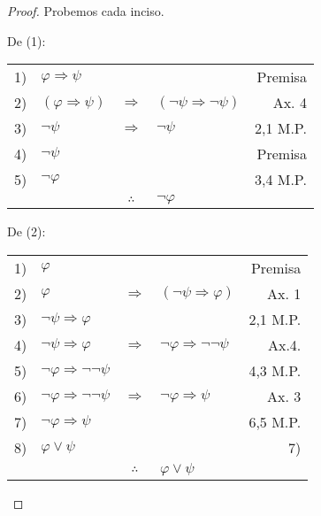 \documentclass[12pt]{report}
\theoremstyle{largebreak}
\begin{document}
    \begin{proof}
        Probemos cada inciso.
        
        De (1): 
        \begin{center}
            \begin{tabular}{l l c l r}
                1) & $\varphi\Rightarrow\psi$ & & & Premisa \\
                2) & $(\varphi\Rightarrow \psi)$ & $\Rightarrow$ & $(\neg \psi\Rightarrow\neg\psi)$ & Ax. 4 \\
                3) & $\neg\psi$ & $\Rightarrow$ & $\neg\psi$ & 2,1 M.P. \\
                4) & $\neg\psi$ &  &  & Premisa \\
                5) & $\neg\varphi$ &  &  & 3,4 M.P. \\
                \hline
                & & $\therefore$ & $\neg\varphi$ & \\
            \end{tabular}
        \end{center}

        De (2): 

        \begin{center}
            \begin{tabular}{l l c l r}
                1) & $\varphi$ & & & Premisa \\
                2) & $\varphi$ & $\Rightarrow$ & $(\neg\psi\Rightarrow\varphi)$ & Ax. 1 \\
                3) & $\neg\psi\Rightarrow\varphi$ & & & 2,1 M.P. \\
                4) & $\neg\psi\Rightarrow\varphi$ & $\Rightarrow$ & $\neg\varphi\Rightarrow\neg\neg\psi$ & Ax.4. \\
                5) & $\neg\varphi\Rightarrow\neg\neg\psi$ & & & 4,3 M.P. \\
                6) & $\neg\varphi\Rightarrow\neg\neg\psi$ & $\Rightarrow$ & $\neg\varphi\Rightarrow\psi$ & Ax. 3 \\
                7) & $\neg\varphi\Rightarrow\psi$ & & & 6,5 M.P. \\
                8) & $\varphi\lor\psi$ & & & 7) \\
                \hline
                & & $\therefore$ & $\varphi\lor\psi$ & \\
            \end{tabular}
        \end{center}


\end{proof}
\end{document}

